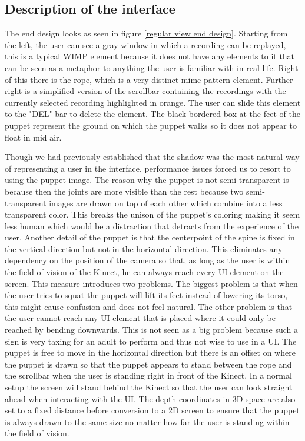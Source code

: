 \subsection{Description of the interface}
\label{interface description}

The end design looks as seen in figure \ref{regular view end design}. Starting from the left, the user can see a gray window in which a recording can be replayed, this is a typical WIMP element because it does not have any elements to it that can be seen as a metaphor to anything the user is familiar with in real life. Right of this there is the rope, which is a very distinct mime pattern element. Further right is a simplified version of the scrollbar containing the recordings with the currently selected recording highlighted in orange. The user can slide this element to the "DEL" bar to delete the element. The black bordered box at the feet of the puppet represent the ground on which the puppet walks so it does not appear to float in mid air.

Though we had previously established that the shadow was the most natural way of representing a user in the interface, performance issues forced us to resort to using the puppet image. The reason why the puppet is not semi-transparent is because then the joints are more visible than the rest because two semi-transparent images are drawn on top of each other which combine into a less transparent color. This breaks the unison of the puppet's coloring making it seem less human which would be a distraction that detracts from the experience of the user. Another detail of the puppet is that the centerpoint of the spine is fixed in the vertical direction but not in the horizontal direction. This eliminates any dependency on the position of the camera so that, as long as the user is within the field of vision of the Kinect, he can always reach every UI element on the screen. This measure introduces two  problems. The biggest problem is that when the user tries to squat the puppet will lift its feet instead of lowering its torso, this might cause confusion and does not feel natural. The other problem is that the user cannot reach any UI element that is placed where it could only be reached by bending downwards. This is not seen as a big problem because such a sign is very taxing for an adult to perform and thus not wise to use in a UI. The puppet is free to move in the horizontal direction but there is an offset on where the puppet is drawn so that the puppet appears to stand between the rope and the scrollbar when the user is standing right in front of the Kinect. In a normal setup the screen will stand behind the Kinect so that the user can look straight ahead when interacting with the UI. The depth coordinates in 3D space are also set to a fixed distance before conversion to a 2D screen to ensure that the puppet is always drawn to the same size no matter how far the user is standing within the field of vision.\\

